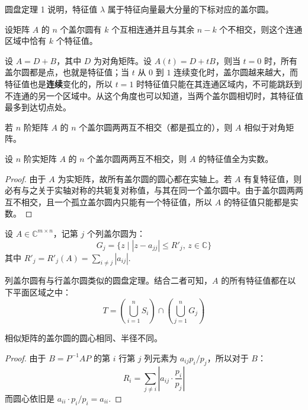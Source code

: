 \begin{remark}
圆盘定理 1 说明，特征值 $\lambda$ 属于特征向量最大分量的下标对应的盖尔圆。
\end{remark}

\begin{theorem}[圆盘定理 2]
设矩阵 $A$ 的 $n$ 个盖尔圆有 $k$ 个互相连通并且与其余 $n-k$ 个不相交，则这个连通区域中恰有 $k$ 个特征值。
\end{theorem}
\begin{remark}
设 $A=D+B$，其中 $D$ 为对角矩阵。设 $A(t)=D+tB$，则当 $t=0$ 时，所有盖尔圆都是点，也就是特征值；当 $t$ 从 $0$ 到 $1$ 连续变化时，盖尔圆越来越大，而特征值也是\textbf{连续}变化的，所以 $t=1$ 时特征值只能在其连通区域内，不可能跳跃到不连通的另一个区域中。从这个角度也可以知道，当两个盖尔圆相切时，其特征值最多到达切点处。
\end{remark}

\begin{corollary}
若 $n$ 阶矩阵 $A$ 的 $n$ 个盖尔圆两两互不相交（都是孤立的），则 $A$ 相似于对角矩阵。
\end{corollary}

\begin{corollary}
设 $n$ 阶实矩阵 $A$ 的 $n$ 个盖尔圆两两互不相交，则 $A$ 的特征值全为实数。
\end{corollary}

\begin{proof}
由于 $A$ 为实矩阵，故所有盖尔圆的圆心都在实轴上。若 $A$ 有复特征值，则必有与之关于实轴对称的共轭复对称值，与其在同一个盖尔圆中。由于盖尔圆两两互不相交，且一个孤立盖尔圆内只能有一个特征值，所以 $A$ 的特征值只能都是实数。
\end{proof}

\begin{definition}[列盖尔圆]
设 $A\in\mathbb C^{m\times n}$，记第 $j$ 个列盖尔圆为：
\[
    G_j=\{z\mid |z-a_{jj}|\leq R'_j,\,z\in\mathbb C\}
\]
其中 $R'_j=R'_j(A)=\sum_{i\neq j}|a_{ij}|$.
\end{definition}

\begin{corollary}
列盖尔圆有与行盖尔圆类似的圆盘定理。结合二者可知，$A$ 的所有特征值都在以下平面区域之中：
\[
T=\left(\bigcup_{i=1}^nS_i\right)\cap\left(\bigcup_{j=1}^nG_j\right)
\]
\end{corollary}

\begin{theorem}
相似矩阵的盖尔圆的圆心相同、半径不同。
\end{theorem}
\begin{proof}
由于 $B=P^{-1}AP$ 的第 $i$ 行第 $j$ 列元素为 $a_{ij}p_i/p_j$，所以对于 $B$：
\[
    R_i=\sum_{j\neq i}\left\vert a_{ij}\cdot\frac{p_i}{p_j}\right\vert
\]
而圆心依旧是 $a_{ii}\cdot p_i/p_i=a_{ii}$.
\end{proof}

